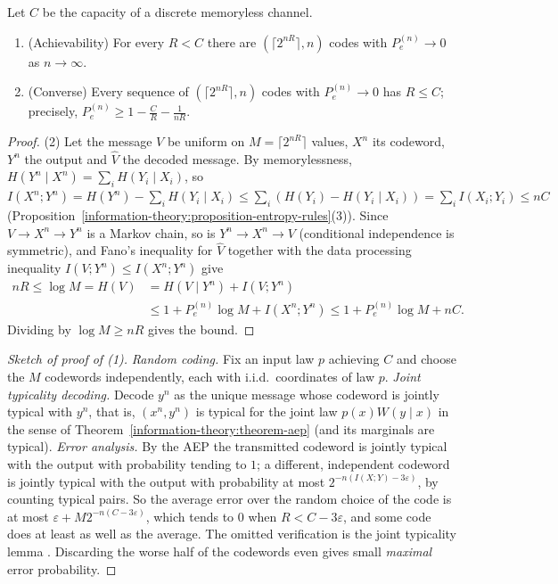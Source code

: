 \begin{theorem}\label{information-theory:theorem-channel-coding}
Let $C$ be the capacity of a discrete memoryless channel.
\begin{enumerate}
\item (Achievability) For every $R < C$ there are $(\lceil 2^{nR}\rceil, n)$ codes with $P_e^{(n)} \to 0$ as $n \to \infty$.
\item (Converse) Every sequence of $(\lceil 2^{nR}\rceil, n)$ codes with $P_e^{(n)} \to 0$ has $R \leq C$; precisely, $P_e^{(n)} \geq 1 - \frac{C}{R} - \frac{1}{nR}$.
\end{enumerate}
\end{theorem}

\begin{proof}
(2) Let the message $V$ be uniform on $M = \lceil 2^{nR}\rceil$ values, $X^n$ its codeword, $Y^n$ the output and $\hat V$ the decoded message. By memorylessness, $H(Y^n \mid X^n) = \sum_iH(Y_i \mid X_i)$, so
$I(X^n; Y^n) = H(Y^n) - \sum_iH(Y_i \mid X_i) \leq \sum_i(H(Y_i) - H(Y_i \mid X_i)) = \sum_iI(X_i; Y_i) \leq nC$ (Proposition~\ref{information-theory:proposition-entropy-rules}(3)). Since $V \to X^n \to Y^n$ is a Markov chain, so is $Y^n \to X^n \to V$ (conditional independence is symmetric), and Fano's inequality for $\hat V$ together with the
data processing inequality $I(V; Y^n) \leq I(X^n; Y^n)$ give
\[\begin{aligned}
nR \leq \log M = H(V) &= H(V \mid Y^n) + I(V; Y^n)\\
&\leq 1 + P_e^{(n)}\log M + I(X^n; Y^n) \leq 1 + P_e^{(n)}\log M + nC.
\end{aligned}\]
Dividing by $\log M \geq nR$ gives the bound.
\end{proof}

\begin{proof}[Sketch of proof of (1)]
\emph{Random coding.} Fix an input law $p$ achieving $C$ and choose the $M$ codewords independently, each with i.i.d.\ coordinates of law $p$. \emph{Joint typicality decoding.} Decode $y^n$ as the unique message whose
codeword is jointly typical with $y^n$, that is, $(x^n, y^n)$ is typical for the joint law $p(x)W(y \mid x)$ in the sense of Theorem~\ref{information-theory:theorem-aep} (and its marginals are typical). \emph{Error analysis.} By the
AEP the transmitted codeword is jointly typical with the output with probability tending to $1$; a different, independent codeword is jointly typical with the output with probability at most $2^{-n(I(X; Y) - 3\varepsilon)}$, by
counting typical pairs. So the average error over the random choice of the code is at most $\varepsilon + M2^{-n(C - 3\varepsilon)}$, which tends to $0$ when $R < C - 3\varepsilon$, and some code does at least as well as the average.
The omitted verification is the joint typicality lemma \cite{cover-thomas}. Discarding the worse half of the codewords even gives small \emph{maximal} error probability.
\end{proof}

